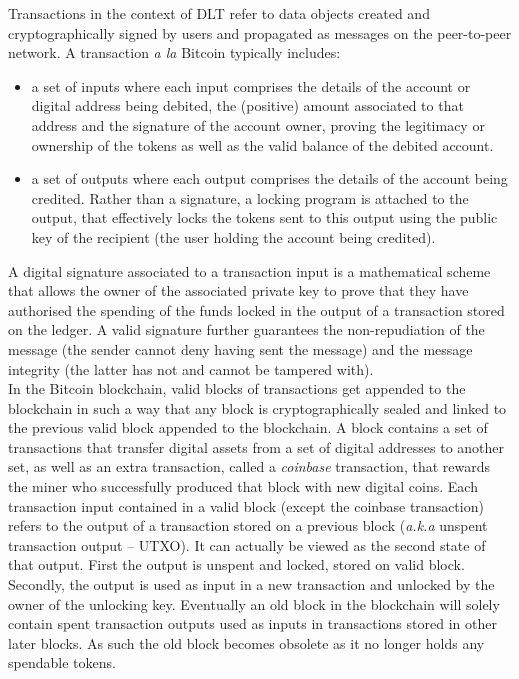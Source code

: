 Transactions in the context of DLT refer to data objects created and cryptographically signed by users and propagated as messages on the peer-to-peer network. A transaction \textit{a la} Bitcoin typically includes:

\begin{itemize}
\item a set of inputs where each input comprises the details of the account or digital address being debited, the (positive) amount associated to that address and the signature of the account owner, proving the legitimacy or ownership of the tokens as well as the valid balance of the debited account. 
\item a set of outputs where each output comprises the details of the account being credited. Rather than a signature, a locking program is attached to the output, that effectively locks the tokens sent to this output using the public key of the recipient (the user holding the account being credited).
\end{itemize}

A digital signature associated to a transaction input is a mathematical scheme that allows the owner of the associated private key to prove that they have authorised the spending of the funds locked in the output of a transaction stored on the ledger. A valid signature further guarantees the non-repudiation of the message (the sender cannot deny having sent the message) and the message integrity (the latter has not and cannot be tampered with). \\

In the Bitcoin blockchain, valid blocks of transactions get appended to the blockchain in such a way that any block is cryptographically sealed and linked to the previous valid block appended to the blockchain. A block contains a set of transactions that transfer digital assets from a set of digital addresses to another set, as well as an extra transaction, called a \textit{coinbase} transaction, that rewards the miner who successfully produced that block with new digital coins. Each transaction input contained in a valid block (except the coinbase transaction) refers to the output of a transaction stored on a previous block (\textit{a.k.a} unspent transaction output – UTXO).  It can actually be viewed as the second state of that output. First the output is unspent and locked, stored on valid block. Secondly, the output is used as input in a new transaction and unlocked by the owner of the unlocking key. Eventually an old block in the blockchain will solely contain spent transaction outputs used as inputs in transactions stored in other later blocks. As such the old block becomes obsolete as it no longer holds any spendable tokens. \\

